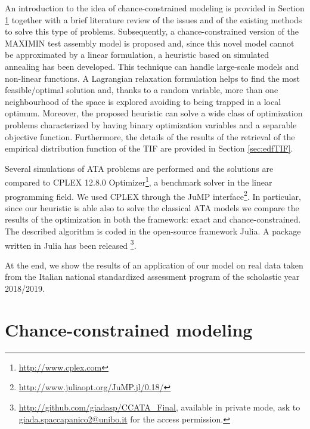 An introduction to the idea of chance-constrained modeling is provided in Section \ref{sec:ccmod} together with a brief literature review of the issues and of the existing methods to solve this type of problems. Subsequently, a chance-constrained version of the MAXIMIN test assembly model is proposed and, since this novel model cannot be approximated by a linear formulation, a heuristic based on simulated annealing \parencite{goffe1996simann} has been developed. This technique can handle large-scale models and non-linear functions. A Lagrangian relaxation formulation helps to find the most feasible/optimal solution and, thanks to a random variable, more than one neighbourhood of the space is explored avoiding to being trapped in a local optimum. Moreover, the proposed heuristic can solve a wide class of optimization problems characterized by having binary optimization variables and a separable objective function. Furthermore, the details of the results of the retrieval of the empirical distribution function of the TIF are provided in Section \ref{sec:edfTIF}.

Several simulations of ATA problems are performed and the solutions are compared to CPLEX 12.8.0 Optimizer\footnote{\url{http://www.cplex.com}}, a benchmark solver in the linear programming field. We used CPLEX through the JuMP interface\footnote{\url{http://www.juliaopt.org/JuMP.jl/0.18/}}. In particular, since our heuristic is able also to solve the classical ATA models we compare the results of the optimization in both the framework: exact and chance-constrained. The described algorithm is coded in the open-source framework Julia. A package written in Julia has been released \footnote{\url{http://github.com/giadasp/CCATA_Final}, available in private mode, ask to \href{mailto:giada.spaccapanico2@unibo.it}{giada.spaccapanico2@unibo.it} for the access permission.}.

At the end, we show the results of an application of our model on real data taken from the Italian national standardized assessment program of the scholastic year 2018/2019.

\section{Chance-constrained modeling}\label{sec:ccmod}

